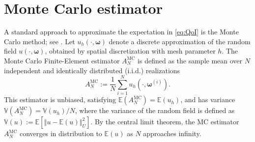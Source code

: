 
\section{Monte Carlo estimator}\label{sec:MC}
A standard approach to approximate the expectation in \eqref{eq:QoI} is the Monte Carlo method; see \cite{ElLiSa:2023,Gi:2008,Gi:2015,PeWiGu:2016}. Let $u_h (\cdot, \boldsymbol{\omega})$ denote a discrete approximation of the random field $u(\cdot, \boldsymbol{\omega})$, obtained by spatial discretization with mesh parameter $h$. The Monte Carlo Finite-Element estimator $A^{\text{MC}}_{N}$ is defined as the sample mean over $N$ independent and identically distributed (i.i.d.) realizations 
%
\begin{equation}\label{eq:MC_estimator}
    A^{\text{MC}}_{N} := \frac{1}{N}\sum_{i=1}^{N} u_{h}\left(\cdot, \boldsymbol{\omega}^{(i)}\right).
\end{equation}
%
This estimator is unbiased, satisfying $\mathbb{E}(A^{\text{MC}}_{N}) = \mathbb{E}(u_{h})$, and has variance $\mathbb{V}(A^{\text{MC}}_{N}) = \mathbb{V}( u_{h})/{N}$, where the variance of the random field is defined as $\mathbb{V}(u) := \mathbb{E}[\left\Vert u - \mathbb{E}(u)\right\Vert_U^2]$. By the central limit theorem, the MC estimator $A^{\text{MC}}_{N}$ converges in distribution to $\mathbb{E}(u)$ as $N$ approaches infinity. 

